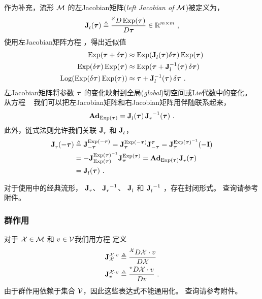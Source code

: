 作为补充，流形 $\cM$ 的左Jacobian矩阵(\emph{left Jacobian of $\cM$})被定义为，
%
\begin{align}
\mjac{}{l}(\bftau) \te \ldpar{\Exp(\bftau)}{\bftau} \in \bbR^{m\times m} 
~,
\label{equ:M_Jl}
\end{align}
%
使用左Jacobian矩阵方程 ，得出近似值
%
\begin{align}
\Exp(\bftau+\delta\bftau) &\approx \Exp(\mjac{}{l}(\bftau)\delta\bftau)\Exp(\bftau)  \label{equ:Jl_1}\\
\Exp(\delta\bftau)\Exp(\bftau) &\approx \Exp(\bftau+\mjac{-1}{l}(\bftau)\,\delta\bftau)  \label{equ:Jl_2}\\
\Log(\Exp(\delta\bftau)\Exp(\bftau)) &\approx \bftau+\mjac{-1}{l}(\bftau)\,\delta\bftau  \label{equ:Jl_3}
~.
\end{align}
% 
左Jacobian矩阵将参数 $\bftau$ 的变化映射到全局(\emph{global})切空间或Lie代数中的变化。
从方程 ~ 我们可以把左Jacobian矩阵和右Jacobian矩阵用伴随联系起来，
%
\begin{align}\label{equ:Jr_Jl_Adj}
\Ad[\cM]{\Exp(\bftau)} = \mjac{}{l}(\bftau)\,\mjac{}{r}\inv(\bftau)
~.
\end{align}
%
此外，链式法则允许我们关联 $\mjac{}{r}$ 和 $\mjac{}{l}$，
%
\begin{align}\label{equ:Jr_minus}
\mjac{}{r}(-\bftau) 
  &\te \mjac{\Exp(-\bftau)}{-\bftau} 
  = \mjac{\Exp(-\bftau)}{\bftau}\mjac{\bftau}{-\bftau} 
  = \mjac{\Exp(\bftau)\inv}{\bftau}(-\bfI) 
  \notag\\
  &
  = -\mjac{\Exp(\bftau)\inv}{\Exp(\bftau)}\mjac{\Exp(\bftau)}{\bftau} 
  = \Ad{\Exp(\bftau)}\mjac{}{r}(\bftau)
  \notag\\
  &
  = \mjac{}{l}(\bftau)
  ~.
\end{align}



对于使用中的经典流形， $\mjac{}{r}$、 $\mjac{}{r}\inv$、 $\mjac{}{l}$ 和 $\mjac{}{l}\inv$ ，存在封闭形式。
查询请参考附件。


\subsubsection{群作用}


对于 $\cX\in\cM$ 和 $v\in\cV$我们用方程  定义
%
\begin{align}
\mjac{\cX\cdot v}{\cX} &\te \rdpar{\cX\cdot v}{\cX} \\
\mjac{\cX\cdot v}{v}   &\te \rdpar{\cX\cdot v}{v} 
~.
\end{align}
%
由于群作用依赖于集合 $\cV$，因此这些表达式不能通用化。
查询请参考附件。




